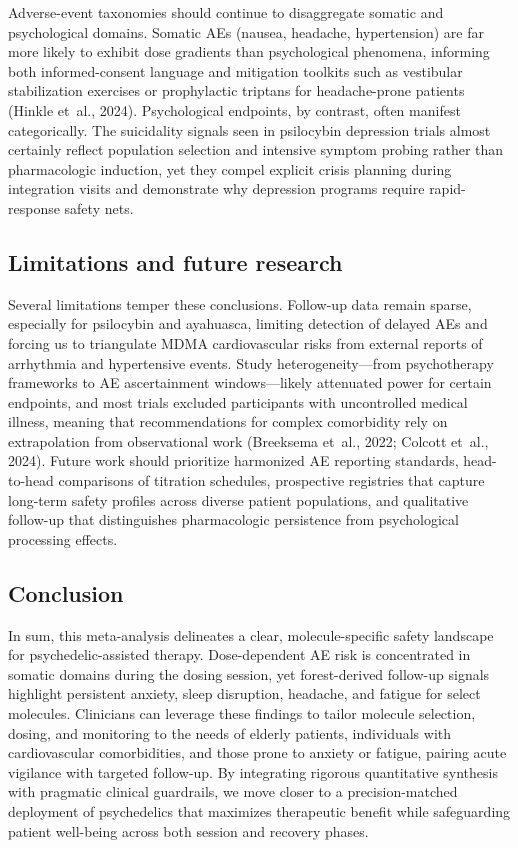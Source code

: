 Adverse-event taxonomies should continue to disaggregate somatic and psychological domains.
Somatic AEs (nausea, headache, hypertension) are far more likely to exhibit dose gradients than psychological phenomena, informing both informed-consent language and mitigation toolkits such as vestibular stabilization exercises or prophylactic triptans for headache-prone patients (Hinkle et~al., 2024).
Psychological endpoints, by contrast, often manifest categorically.
The suicidality signals seen in psilocybin depression trials almost certainly reflect population selection and intensive symptom probing rather than pharmacologic induction, yet they compel explicit crisis planning during integration visits and demonstrate why depression programs require rapid-response safety nets.

\subsection{Limitations and future research}

Several limitations temper these conclusions.
Follow-up data remain sparse, especially for psilocybin and ayahuasca, limiting detection of delayed AEs and forcing us to triangulate MDMA cardiovascular risks from external reports of arrhythmia and hypertensive events.
Study heterogeneity---from psychotherapy frameworks to AE ascertainment windows---likely attenuated power for certain endpoints, and most trials excluded participants with uncontrolled medical illness, meaning that recommendations for complex comorbidity rely on extrapolation from observational work (Breeksema et~al., 2022; Colcott et~al., 2024).
Future work should prioritize harmonized AE reporting standards, head-to-head comparisons of titration schedules, prospective registries that capture long-term safety profiles across diverse patient populations, and qualitative follow-up that distinguishes pharmacologic persistence from psychological processing effects.

\subsection{Conclusion}

In sum, this meta-analysis delineates a clear, molecule-specific safety landscape for psychedelic-assisted therapy.
Dose-dependent AE risk is concentrated in somatic domains during the dosing session, yet forest-derived follow-up signals highlight persistent anxiety, sleep disruption, headache, and fatigue for select molecules.
Clinicians can leverage these findings to tailor molecule selection, dosing, and monitoring to the needs of elderly patients, individuals with cardiovascular comorbidities, and those prone to anxiety or fatigue, pairing acute vigilance with targeted follow-up.
By integrating rigorous quantitative synthesis with pragmatic clinical guardrails, we move closer to a precision-matched deployment of psychedelics that maximizes therapeutic benefit while safeguarding patient well-being across both session and recovery phases.
